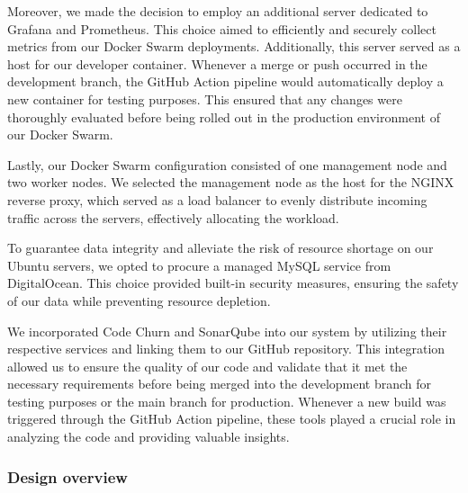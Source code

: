Moreover, we made the decision to employ an additional server dedicated to Grafana and Prometheus. This choice aimed to efficiently and securely collect metrics from our Docker Swarm deployments. Additionally, this server served as a host for our developer container. Whenever a merge or push occurred in the development branch, the GitHub Action pipeline would automatically deploy a new container for testing purposes. This ensured that any changes were thoroughly evaluated before being rolled out in the production environment of our Docker Swarm.

Lastly, our Docker Swarm configuration consisted of one management node and two worker nodes. We selected the management node as the host for the NGINX reverse proxy, which served as a load balancer to evenly distribute incoming traffic across the servers, effectively allocating the workload.

To guarantee data integrity and alleviate the risk of resource shortage on our Ubuntu servers, we opted to procure a managed MySQL service from DigitalOcean. This choice provided built-in security measures, ensuring the safety of our data while preventing resource depletion.

We incorporated Code Churn and SonarQube into our system by utilizing their respective services and linking them to our GitHub repository. This integration allowed us to ensure the quality of our code and validate that it met the necessary requirements before being merged into the development branch for testing purposes or the main branch for production. Whenever a new build was triggered through the GitHub Action pipeline, these tools played a crucial role in analyzing the code and providing valuable insights.

\subsubsection{Design overview}

